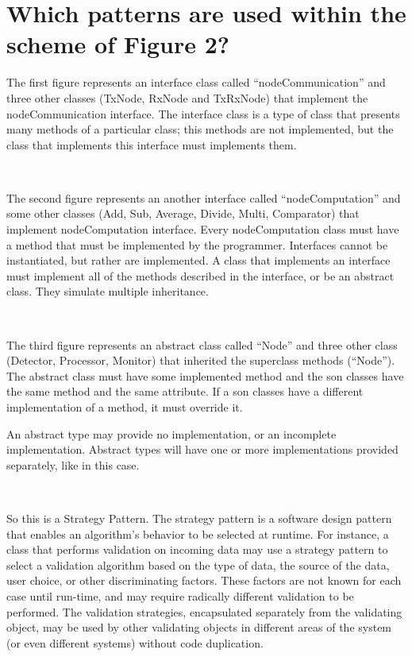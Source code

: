\documentclass[a4paper,titlepage]{article}
\begin{document}
\section{ Which patterns are used within the scheme of Figure 2?}

The first figure represents an interface class called ``nodeCommunication'' and three other classes (TxNode, RxNode and TxRxNode) that implement the nodeCommunication interface. The interface class is a type of class that presents many methods of a particular class; this methods are not implemented, but the class that implements this interface must implements them.

~

The second figure represents an another interface called ``nodeComputation'' and some other classes (Add, Sub, Average, Divide, Multi, Comparator) that implement nodeComputation interface. Every nodeComputation class must have a method that must be implemented by the programmer. Interfaces cannot be instantiated, but rather are implemented. A class that implements an interface must implement all of the methods described in the interface, or be an abstract class. They simulate multiple inheritance.

~

The third figure represents an abstract class called ``Node'' and three other class (Detector, Processor, Monitor) that inherited the superclass methods (``Node''). The abstract class must have some implemented method and the son classes have the same method and the same attribute. If a son classes have a different implementation of a method, it must override it.  

An abstract type may provide no implementation, or an incomplete implementation. Abstract types will have one or more implementations provided separately, like in this case. 

~

So this is a Strategy Pattern. The strategy pattern is a software design pattern that enables an algorithm's behavior to be selected at runtime. For instance, a class that performs validation on incoming data may use a strategy pattern to select a validation algorithm based on the type of data, the source of the data, user choice, or other discriminating factors. These factors are not known for each case until run-time, and may require radically different validation to be performed. The validation strategies, encapsulated separately from the validating object, may be used by other validating objects in different areas of the system (or even different systems) without code duplication.
\end{document}
